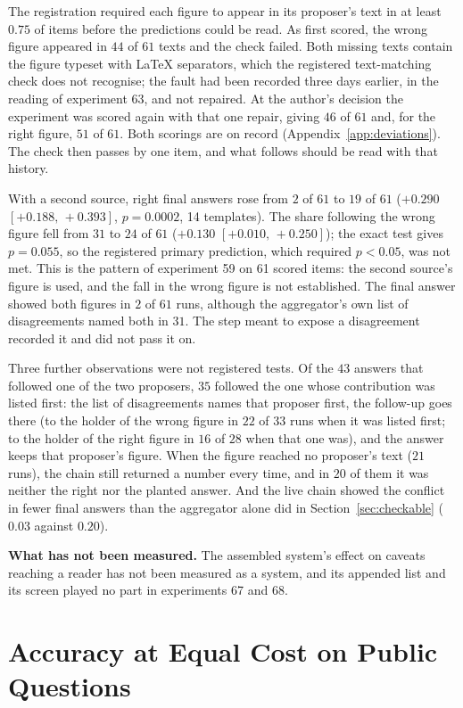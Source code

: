 \documentclass[10pt,twocolumn]{article}
\newcommand{\ci}[2]{\ensuremath{[#1,\,#2]}}
\begin{document}
The registration required each figure to appear in its proposer's text
in at least $0.75$ of items before the predictions could be read. As
first scored, the wrong figure appeared in $44$ of $61$ texts and the
check failed. Both missing texts contain the figure typeset with LaTeX
separators, which the registered text-matching check does not
recognise; the fault had been recorded three days earlier, in the
reading of experiment 63, and not repaired. At the author's decision
the experiment was scored again with that one repair, giving $46$ of
$61$ and, for the right figure, $51$ of $61$. Both scorings are on
record (Appendix~\ref{app:deviations}). The check then passes by one
item, and what follows should be read with that history.

With a second source, right final answers rose from $2$ of $61$ to
$19$ of $61$ ($+0.290$ \ci{+0.188}{+0.393}, $p=0.0002$, 14 templates).
The share following the wrong figure fell from $31$ to $24$ of $61$
($+0.130$ \ci{+0.010}{+0.250}); the exact test gives $p=0.055$, so the
registered primary prediction, which required $p<0.05$, was not met.
This is the pattern of experiment 59 on 61 scored items: the second
source's figure is used, and the fall in the wrong figure is not
established. The final answer showed both figures in $2$ of $61$ runs,
although the aggregator's own list of disagreements named both in $31$.
The step meant to expose a disagreement recorded it and did not pass it
on.

Three further observations were not registered tests. Of the $43$
answers that followed one of the two proposers, $35$ followed the one
whose contribution was listed first: the list of disagreements names
that proposer first, the follow-up goes there (to the holder of the
wrong figure in $22$ of $33$ runs when it was listed first; to the
holder of the right figure in $16$ of $28$ when that one was), and the
answer keeps that proposer's figure. When the figure reached no
proposer's text ($21$ runs), the chain still returned a number every
time, and in $20$ of them it was neither the right nor the planted
answer. And the live chain showed the conflict in fewer final answers
than the aggregator alone did in Section~\ref{sec:checkable} ($0.03$
against $0.20$).

\textbf{What has not been measured.} The assembled system's effect on
caveats reaching a reader has not been measured as a system, and its
appended list and its screen played no part in experiments 67 and 68.

\section{Accuracy at Equal Cost on Public Questions}
\label{sec:accuracy}
\end{document}
